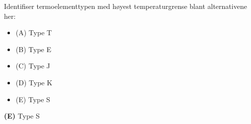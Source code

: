 

Identifiser termoelementtypen med høyest temperaturgrense blant alternativene her:

\begin{itemize}
\item{(A)} Type T
\vskip 5pt 
\item{(B)} Type E
\vskip 5pt 
\item{(C)} Type J
\vskip 5pt 
\item{(D)} Type K
\vskip 5pt 
\item{(E)} Type S
\end{itemize}







{\bf (E)} Type S
 










